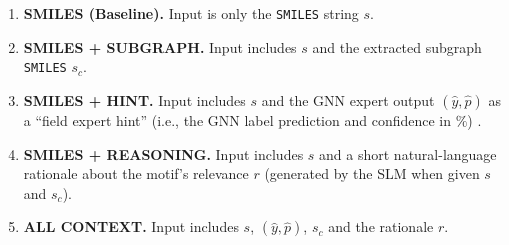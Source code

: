 \documentclass[
]{ceurart}
\newcommand{\tool}[1]{\textsc{#1}}
\newcommand{\smiles}{\texttt{SMILES}}
\begin{document}
\begin{enumerate}[leftmargin=1.2em]
  \item \textbf{SMILES (Baseline).} Input is only the \smiles{} string $s$.
  \item \textbf{SMILES + SUBGRAPH.} Input includes $s$ and the extracted subgraph \smiles{} $s_c$.
  \item \textbf{SMILES + HINT.} Input includes $s$ and the GNN expert output $(\hat{y},\hat{p})$ as a ``field expert hint'' (i.e., the GNN label prediction and confidence in $\%$) .
  \item \textbf{SMILES + REASONING.} Input includes $s$ and a short natural-language rationale about the motif's relevance $r$ (generated by the SLM when given $s$ and $s_c$).
  \item \textbf{ALL CONTEXT.} Input includes $s$, $(\hat{y},\hat{p})$, $s_c$ and the rationale $r$.
\end{enumerate}






\end{document}
